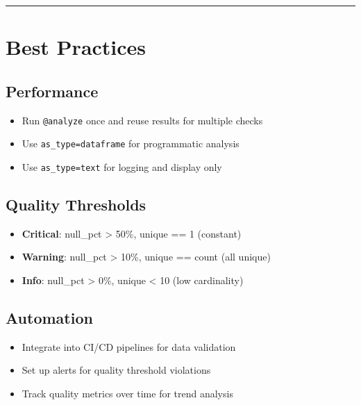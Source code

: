 \documentclass[
  letterpaper,
]{scrbook}
\providecommand{\tightlist}{%
  \setlength{\itemsep}{0pt}\setlength{\parskip}{0pt}}
\begin{document}
\begin{center}\rule{0.5\linewidth}{0.5pt}\end{center}

\section{Best Practices}\label{best-practices-6}

\subsection{Performance}\label{performance-1}

\begin{itemize}
\tightlist
\item
  Run \texttt{@analyze} once and reuse results for multiple checks
\item
  Use \texttt{as\_type=\textquotesingle{}dataframe\textquotesingle{}}
  for programmatic analysis
\item
  Use \texttt{as\_type=\textquotesingle{}text\textquotesingle{}} for
  logging and display only
\end{itemize}

\subsection{Quality Thresholds}\label{quality-thresholds}

\begin{itemize}
\tightlist
\item
  \textbf{Critical}: null\_pct \textgreater{} 50\%, unique == 1
  (constant)
\item
  \textbf{Warning}: null\_pct \textgreater{} 10\%, unique == count (all
  unique)
\item
  \textbf{Info}: null\_pct \textgreater{} 0\%, unique \textless{} 10
  (low cardinality)
\end{itemize}

\subsection{Automation}\label{automation}

\begin{itemize}
\tightlist
\item
  Integrate into CI/CD pipelines for data validation
\item
  Set up alerts for quality threshold violations
\item
  Track quality metrics over time for trend analysis
\end{itemize}
\end{document}
